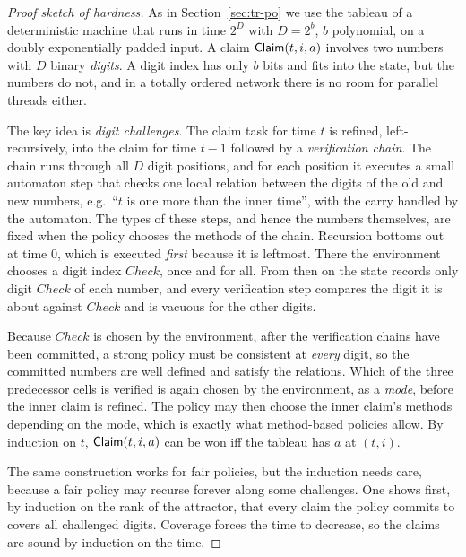 \begin{proof}[Proof sketch of hardness]
  As in Section~\ref{sec:tr-po} we use the tableau of a deterministic machine that runs in time
  $2^D$ with $D=2^b$, $b$ polynomial, on a doubly exponentially padded input. A claim
  $\textsf{Claim}(t,i,a)$ involves two numbers with $D$ binary \emph{digits}. A digit index has only $b$
  bits and fits into the state, but the numbers do not, and in a totally ordered network there is
  no room for parallel threads either.

  The key idea is \emph{digit challenges}. The claim task for time $t$ is refined, left-recursively,
  into the claim for time $t-1$ followed by a \emph{verification chain}. The chain runs through all
  $D$ digit positions, and for each position it executes a small automaton step that checks one
  local relation between the digits of the old and new numbers, e.g.\ ``$t$ is one more than the
  inner time'', with the carry handled by the automaton. The types of these steps, and hence the
  numbers themselves, are fixed when the policy chooses the methods of the chain. Recursion
  bottoms out at time $0$, which is executed \emph{first} because it is leftmost. There the
  environment chooses a digit index $\mathit{Check}$, once and for all. From then on the state
  records only digit $\mathit{Check}$ of each number, and every verification step compares the
  digit it is about against $\mathit{Check}$ and is vacuous for the other digits.

  Because $\mathit{Check}$ is chosen by the environment, after the verification chains have been
  committed, a strong policy must be consistent at \emph{every} digit, so the committed numbers are
  well defined and satisfy the relations. Which of the three predecessor cells is verified is again
  chosen by the environment, as a \emph{mode}, before the inner claim is refined. The policy may then
  choose the inner claim's methods depending on the mode, which is exactly what method-based
  policies allow. By induction on $t$, $\textsf{Claim}(t,i,a)$ can be won iff the tableau has $a$ at
  $(t,i)$.

  The same construction works for fair policies, but the induction needs care, because a fair
  policy may recurse forever along some challenges. One shows first, by induction on the rank of
  the attractor, that every claim the policy commits to covers all challenged digits. Coverage forces
  the time to decrease, so the claims are sound by induction on the time.
\end{proof}
